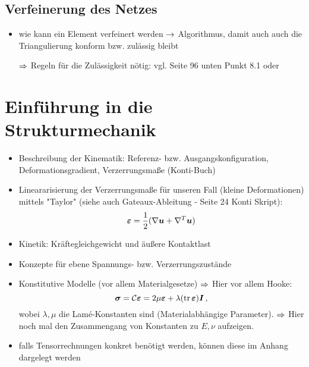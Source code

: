 \subsection{Verfeinerung des Netzes}

\begin{itemize}
\item wie kann ein Element verfeinert werden $\rightarrow$ Algorithmus, damit auch auch die Triangulierung konform bzw. zulässig bleibt

\item[$\Rightarrow$] Regeln für die Zulässigkeit nötig: vgl. \cite{BraeFEM} Seite 96 unten Punkt 8.1 oder \cite{StarkePDE}
\end{itemize}






\section{Einführung in die Strukturmechanik}

\begin{itemize}
\item Beschreibung der Kinematik: Referenz- bzw. Ausgangskonfiguration, Deformationsgradient, Verzerrungsmaße (Konti-Buch)
\item Lineararisierung der Verzerrungsmaße für unseren Fall (kleine Deformationen) mittels "Taylor" (siehe auch Gateaux-Ableitung - Seite 24 Konti Skript):
\[
	\boldsymbol {\varepsilon} = \frac 1 2 (\nabla \boldsymbol u + \nabla^T \boldsymbol u)
\]
\item Kinetik: Kräftegleichgewicht und äußere Kontaktlast
\item Konzepte für ebene Spannungs- bzw. Verzerrungszustände
\item Konstitutive Modelle (vor allem Materialgesetze) $\Rightarrow$ Hier vor allem Hooke:
\[
	\boldsymbol \sigma = \mathcal C \boldsymbol {\varepsilon} = 2 \mu \boldsymbol {\varepsilon} + \lambda (\operatorname{tr} \boldsymbol {\varepsilon}) \boldsymbol I \, ,
\]
wobei $\lambda,\mu$ die Lamé-Konstanten sind (Materialabhängige Parameter). $\Rightarrow$ Hier noch mal den Zusammengang von Konstanten zu $E,\nu$ aufzeigen.
\item falls Tensorrechnungen konkret benötigt werden, können diese im Anhang dargelegt werden
\end{itemize}


\newpage

